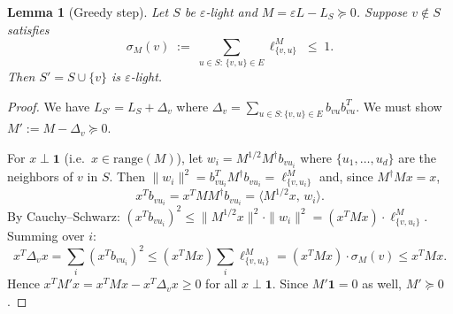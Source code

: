 \documentclass[12pt]{article}
\newtheorem{lemma}[theorem]{Lemma}
\begin{document}
\begin{lemma}[Greedy step]\label{lem:greedy}
Let $S$ be $\varepsilon$-light and $M = \varepsilon L - L_S \succeq 0$.
Suppose $v\notin S$ satisfies
\begin{equation}\label{eq:crit}
  \sigma_M(v) \;:=\; \sum_{u\in S:\,\{v,u\}\in E} \ell_{\{v,u\}}^M \;\leq\; 1.
\end{equation}
Then $S' = S\cup\{v\}$ is $\varepsilon$-light.
\end{lemma}
\begin{proof}
We have $L_{S'} = L_S + \Delta_v$ where
$\Delta_v = \sum_{u\in S:\{v,u\}\in E}b_{vu}b_{vu}^T$.
We must show $M' := M - \Delta_v \succeq 0$.

For $x\perp\mathbf{1}$ (i.e.\ $x\in\mathrm{range}(M)$), let
$w_i = M^{1/2}M^\dagger b_{vu_i}$ where $\{u_1,\ldots,u_d\}$ are the neighbors
of $v$ in $S$.  Then $\|w_i\|^2 = b_{vu_i}^T M^\dagger b_{vu_i} = \ell_{\{v,u_i\}}^M$
and, since $M^\dagger M x = x$,
\[
  x^T b_{vu_i} = x^T M M^\dagger b_{vu_i} = \langle M^{1/2}x,\, w_i\rangle.
\]
By Cauchy--Schwarz:
$(x^T b_{vu_i})^2 \leq \|M^{1/2}x\|^2\cdot\|w_i\|^2 = (x^T M x)\cdot\ell_{\{v,u_i\}}^M$.
Summing over $i$:
\[
  x^T \Delta_v x
  = \sum_i (x^T b_{vu_i})^2
  \leq (x^T M x)\sum_i \ell_{\{v,u_i\}}^M
  = (x^T M x)\cdot\sigma_M(v)
  \leq x^T M x.
\]
Hence $x^T M' x = x^T M x - x^T \Delta_v x \geq 0$ for all $x\perp\mathbf{1}$.
Since $M'\mathbf{1} = 0$ as well, $M'\succeq 0$.
\end{proof}
\end{document}
